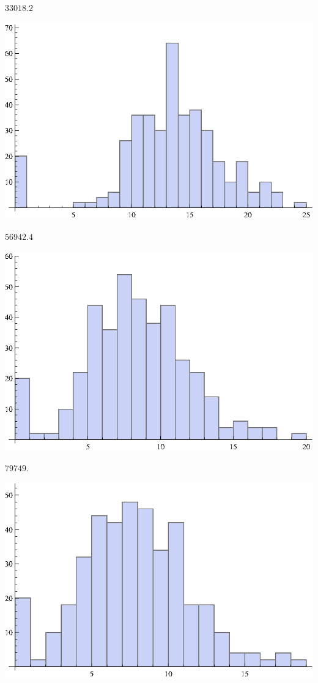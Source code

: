 \documentclass{article}
\begin{document}
\noindent\(33018.2\)

\includegraphics{1_gr3.eps}

\noindent\(56942.4\)

\includegraphics{1_gr4.eps}

\noindent\(79749.\)

\includegraphics{1_gr5.eps}
\end{document}
